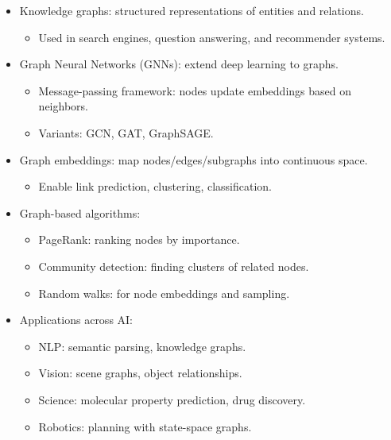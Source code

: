 \documentclass[
  letterpaper,
  DIV=11,
  numbers=noendperiod]{scrreprt}
\providecommand{\tightlist}{%
  \setlength{\itemsep}{0pt}\setlength{\parskip}{0pt}}
\begin{document}
\begin{itemize}
\item
  Knowledge graphs: structured representations of entities and
  relations.

  \begin{itemize}
  \tightlist
  \item
    Used in search engines, question answering, and recommender systems.
  \end{itemize}
\item
  Graph Neural Networks (GNNs): extend deep learning to graphs.

  \begin{itemize}
  \tightlist
  \item
    Message-passing framework: nodes update embeddings based on
    neighbors.
  \item
    Variants: GCN, GAT, GraphSAGE.
  \end{itemize}
\item
  Graph embeddings: map nodes/edges/subgraphs into continuous space.

  \begin{itemize}
  \tightlist
  \item
    Enable link prediction, clustering, classification.
  \end{itemize}
\item
  Graph-based algorithms:

  \begin{itemize}
  \tightlist
  \item
    PageRank: ranking nodes by importance.
  \item
    Community detection: finding clusters of related nodes.
  \item
    Random walks: for node embeddings and sampling.
  \end{itemize}
\item
  Applications across AI:

  \begin{itemize}
  \tightlist
  \item
    NLP: semantic parsing, knowledge graphs.
  \item
    Vision: scene graphs, object relationships.
  \item
    Science: molecular property prediction, drug discovery.
  \item
    Robotics: planning with state-space graphs.
  \end{itemize}
\end{itemize}
\end{document}
